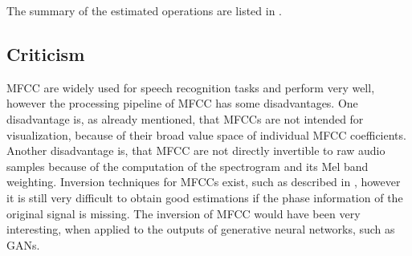 The summary of the estimated operations are listed in .




\subsection{Criticism}
\thesisStateRevised
MFCC are widely used for speech recognition tasks and perform very well, however the processing pipeline of MFCC has some disadvantages.
One disadvantage is, as already mentioned, that MFCCs are not intended for visualization, because of their broad value space of individual MFCC coefficients.
Another disadvantage is, that MFCC are not directly invertible to raw audio samples because of the computation of the spectrogram and its Mel band weighting.
Inversion techniques for MFCCs exist, such as described in \cite{Boucheron2008}, however it is still very difficult to obtain good estimations if the phase information of the original signal is missing.
The inversion of MFCC would have been very interesting, when applied to the outputs of generative neural networks, such as GANs.